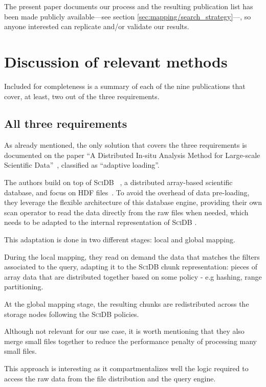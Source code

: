 The present paper documents our process and the resulting
publication list has been made publicly available---see section
\ref{sec:mapping/search_strategy}---, so anyone interested can
replicate and/or validate our results.

\section{Discussion of relevant methods}
\label{sec:mapping/details}
Included for completeness is a summary of each of the nine publications 
that cover, at least, two out of the three requirements.

\subsection{All three requirements}
\newcommand{\scidb}[0]{\textsc{SciDB} }

As already mentioned, the only solution that covers the three requirements is
documented on the paper ``A Distributed In-situ Analysis Method for Large-scale
Scientific Data''~\cite{Han2017}, classified as ``adaptive loading''.

The authors build on top of \scidb~\cite{Stonebraker2011}, a distributed
array-based scientific database, and focus on \textsc{HDF} files~\cite{HDF}.
To avoid the overhead of data pre-loading, they leverage the flexible
architecture of this database engine, providing their own scan operator to read
the data directly from the raw files when needed, which needs to be adapted
to the internal representation of \scidb.

This adaptation is done in two different stages: local and global mapping.

During the local mapping, they read on demand the data that matches the filters 
associated to the query, adapting it to the \scidb chunk representation: pieces 
of array data that are distributed together based on some policy - e.g hashing, 
range partitioning.

At the global mapping stage, the resulting chunks are redistributed across the 
storage nodes following the \scidb policies.

Although not relevant for our use case, it is worth mentioning that they also
merge small files together to reduce the performance penalty of processing many
small files.

This approach is interesting as it compartmentalizes well the logic
required to access the raw data from the file distribution and the query engine.

